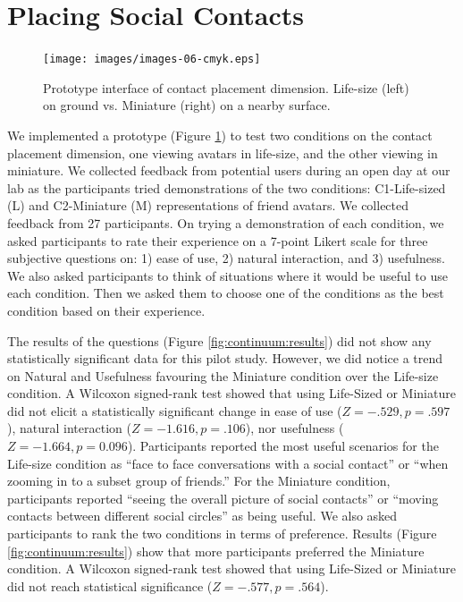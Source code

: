 \section{Placing Social Contacts}
\label{sec:contacts:placing}

\begin{figure}
    \centering
    \texttt{[image: images/images-06-cmyk.eps]}
    \caption{Prototype interface of contact placement dimension. Life-size (left) on ground vs. Miniature (right) on a nearby surface.} 
    \label{fig:continuum:conditions}
\end{figure}

We implemented a prototype (Figure \ref{fig:continuum:conditions}) to test two conditions on the contact placement dimension, one viewing avatars in life-size, and the other viewing in miniature. 
We collected feedback from potential users during an open day at our lab as the participants tried demonstrations of the two conditions: C1-Life-sized (L) and C2-Miniature (M) representations of friend avatars. We collected feedback from 27 participants. On trying a demonstration of each condition, we asked participants to rate their experience on a 7-point Likert scale for three subjective questions on: 1) ease of use, 2) natural interaction, and 3) usefulness. We also asked participants to think of situations where it would be useful to use each condition. Then we asked them to choose one of the conditions as the best condition based on their experience. 

The results of the questions (Figure \ref{fig:continuum:results}) did not show any statistically significant data for this pilot study. However, we did notice a trend on Natural and Usefulness favouring the Miniature condition over the Life-size condition. A Wilcoxon signed-rank test showed that using Life-Sized or Miniature did not elicit a statistically significant change in ease of use ($Z=-.529, p=.597$), natural interaction ($Z=-1.616, p=.106$), nor usefulness ($Z=-1.664, p=0.096$). Participants reported the most useful scenarios for the Life-size condition as \enquote{face to face conversations with a social contact} or \enquote{when zooming in to a subset group of friends.} For the Miniature condition, participants reported \enquote{seeing the overall picture of social contacts} or \enquote{moving contacts between different social circles} as being useful. We also asked participants to rank the two conditions in terms of preference. Results (Figure \ref{fig:continuum:results}) show that more participants preferred the Miniature condition. A Wilcoxon signed-rank test showed that using Life-Sized or Miniature did not reach statistical significance ($Z=-.577, p=.564$).

